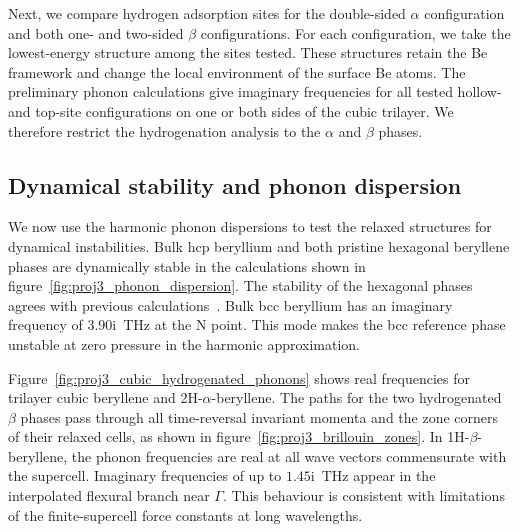 Next, we compare hydrogen adsorption sites for the double-sided $\alpha$ configuration and both one- and two-sided $\beta$ configurations.
For each configuration, we take the lowest-energy structure among the sites tested.
These structures retain the Be framework and change the local environment of the surface Be atoms.
The preliminary phonon calculations give imaginary frequencies for all tested hollow- and top-site configurations on one or both sides of the cubic trilayer.
We therefore restrict the hydrogenation analysis to the $\alpha$ and $\beta$ phases.

\FloatBarrier
\subsection{Dynamical stability and phonon dispersion}
\label{3_dynamical_stability_and_phonon_dispersion}

We now use the harmonic phonon dispersions to test the relaxed structures for dynamical instabilities.
Bulk hcp beryllium and both pristine hexagonal beryllene phases are dynamically stable in the calculations shown in figure~\ref{fig:proj3_phonon_dispersion}.
The stability of the hexagonal phases agrees with previous calculations~\cite{li2023coexistence}.
Bulk bcc beryllium has an imaginary frequency of $3.90\mathrm{i}$~\unit{\tera\hertz} at the $\mathrm{N}$ point.
This mode makes the bcc reference phase unstable at zero pressure in the harmonic approximation.

Figure~\ref{fig:proj3_cubic_hydrogenated_phonons} shows real frequencies for trilayer cubic beryllene and 2H-$\alpha$-beryllene.
The paths for the two hydrogenated $\beta$ phases pass through all time-reversal invariant momenta and the zone corners of their relaxed cells, as shown in figure~\ref{fig:proj3_brillouin_zones}.
In 1H-$\beta$-beryllene, the phonon frequencies are real at all wave vectors commensurate with the supercell.
Imaginary frequencies of up to $1.45\mathrm{i}$~\unit{\tera\hertz} appear in the interpolated flexural branch near $\Gamma$.
This behaviour is consistent with limitations of the finite-supercell force constants at long wavelengths.

